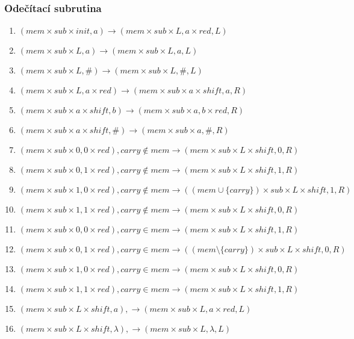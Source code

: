 \documentclass[a4paper,12pt]{article} %
\begin{document}
\subsubsection*{Odečítací subrutina}

\begin{enumerate}
    \item $(mem \times sub \times init, a) \to (mem \times sub \times L, a \times red, L)$
    \item $(mem \times sub \times L, a) \to (mem \times sub \times L, a, L)$
    \item $(mem \times sub \times L, \#) \to (mem \times sub \times L, \#, L)$
    \item $(mem \times sub \times L, a \times red) \to (mem \times sub \times a \times shift, a, R)$
    \item $(mem \times sub \times a \times shift, b) \to (mem \times sub \times a, b \times red, R)$
    \item $(mem \times sub \times a \times shift, \#) \to (mem \times sub \times a, \#, R)$
    \item $(mem \times sub \times 0, 0 \times red), carry \not\in mem \to (mem \times sub \times L \times shift, 0, R)$
    \item $(mem \times sub \times 0, 1 \times red), carry \not\in mem \to (mem \times sub \times L \times shift, 1, R)$
    \item $(mem \times sub \times 1, 0 \times red), carry \not\in mem \to ((mem \cup \{carry\}) \times sub \times L \times shift, 1, R)$
    \item $(mem \times sub \times 1, 1 \times red), carry \not\in mem \to (mem \times sub \times L \times shift, 0, R)$
    \item $(mem \times sub \times 0, 0 \times red), carry \in mem \to (mem \times sub \times L \times shift, 1, R)$
    \item $(mem \times sub \times 0, 1 \times red), carry \in mem \to ((mem \setminus \{carry\}) \times sub \times L \times shift, 0, R)$
    \item $(mem \times sub \times 1, 0 \times red), carry \in mem \to (mem \times sub \times L \times shift, 0, R)$
    \item $(mem \times sub \times 1, 1 \times red), carry \in mem \to (mem \times sub \times L \times shift, 1, R)$
    \item $(mem \times sub \times L \times shift, a), \to (mem \times sub \times L, a \times red, L)$
    \item $(mem \times sub \times L \times shift, \lambda), \to (mem \times sub \times L, \lambda, L)$

\end{enumerate}
\end{document}
